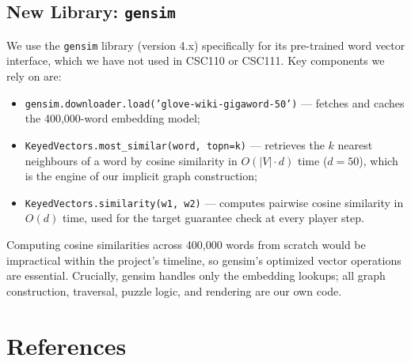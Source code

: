 \documentclass[11pt]{article}
\begin{document}
\subsection*{New Library: \texttt{gensim}}

We use the \texttt{gensim} library (version 4.x) \cite{gensim} specifically for
its pre-trained word vector interface, which we have not used in CSC110 or
CSC111.  Key components we rely on are:
\begin{itemize}
    \item \texttt{gensim.downloader.load('glove-wiki-gigaword-50')} --- fetches
          and caches the 400,000-word embedding model;
    \item \texttt{KeyedVectors.most\_similar(word, topn=k)} --- retrieves the
          $k$ nearest neighbours of a word by cosine similarity in
          $O(|V| \cdot d)$ time ($d = 50$), which is the engine of our implicit
          graph construction;
    \item \texttt{KeyedVectors.similarity(w1, w2)} --- computes pairwise cosine
          similarity in $O(d)$ time, used for the target guarantee check at
          every player step.
\end{itemize}
Computing cosine similarities across 400,000 words from scratch would be
impractical within the project's timeline, so gensim's optimized vector
operations are essential. Crucially, gensim handles only the embedding lookups;
all graph construction, traversal, puzzle logic, and rendering are our own code.


\section*{References}
\end{document}
